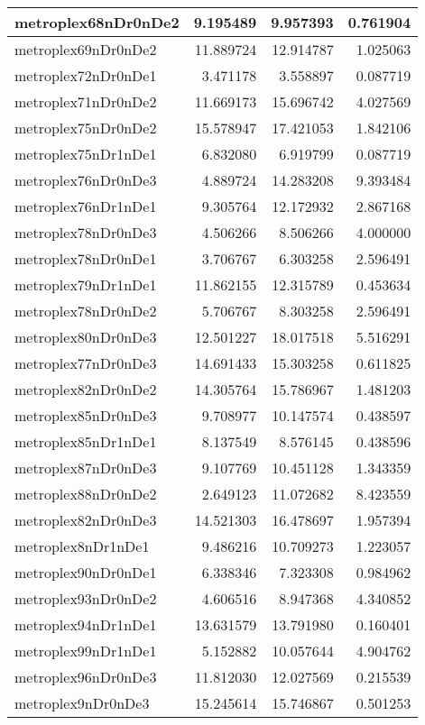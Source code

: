 \begin{longtable}{|l|r|r|r|}
metroplex68nDr0nDe2 & 9.195489 & 9.957393 & 0.761904 \\\hline
metroplex69nDr0nDe2 & 11.889724 & 12.914787 & 1.025063 \\\hline
metroplex72nDr0nDe1 & 3.471178 & 3.558897 & 0.087719 \\\hline
metroplex71nDr0nDe2 & 11.669173 & 15.696742 & 4.027569 \\\hline
metroplex75nDr0nDe2 & 15.578947 & 17.421053 & 1.842106 \\\hline
metroplex75nDr1nDe1 & 6.832080 & 6.919799 & 0.087719 \\\hline
metroplex76nDr0nDe3 & 4.889724 & 14.283208 & 9.393484 \\\hline
metroplex76nDr1nDe1 & 9.305764 & 12.172932 & 2.867168 \\\hline
metroplex78nDr0nDe3 & 4.506266 & 8.506266 & 4.000000 \\\hline
metroplex78nDr0nDe1 & 3.706767 & 6.303258 & 2.596491 \\\hline
metroplex79nDr1nDe1 & 11.862155 & 12.315789 & 0.453634 \\\hline
metroplex78nDr0nDe2 & 5.706767 & 8.303258 & 2.596491 \\\hline
metroplex80nDr0nDe3 & 12.501227 & 18.017518 & 5.516291 \\\hline
metroplex77nDr0nDe3 & 14.691433 & 15.303258 & 0.611825 \\\hline
metroplex82nDr0nDe2 & 14.305764 & 15.786967 & 1.481203 \\\hline
metroplex85nDr0nDe3 & 9.708977 & 10.147574 & 0.438597 \\\hline
metroplex85nDr1nDe1 & 8.137549 & 8.576145 & 0.438596 \\\hline
metroplex87nDr0nDe3 & 9.107769 & 10.451128 & 1.343359 \\\hline
metroplex88nDr0nDe2 & 2.649123 & 11.072682 & 8.423559 \\\hline
metroplex82nDr0nDe3 & 14.521303 & 16.478697 & 1.957394 \\\hline
metroplex8nDr1nDe1 & 9.486216 & 10.709273 & 1.223057 \\\hline
metroplex90nDr0nDe1 & 6.338346 & 7.323308 & 0.984962 \\\hline
metroplex93nDr0nDe2 & 4.606516 & 8.947368 & 4.340852 \\\hline
metroplex94nDr1nDe1 & 13.631579 & 13.791980 & 0.160401 \\\hline
metroplex99nDr1nDe1 & 5.152882 & 10.057644 & 4.904762 \\\hline
metroplex96nDr0nDe3 & 11.812030 & 12.027569 & 0.215539 \\\hline
metroplex9nDr0nDe3 & 15.245614 & 15.746867 & 0.501253 \\\hline
\end{longtable}
